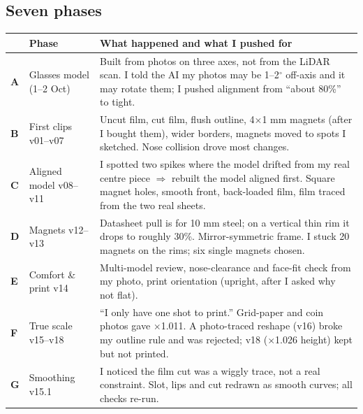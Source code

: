 \documentclass[10pt,a4paper,oneside]{article}
\begin{document}
\subsection{Seven phases}
\begin{center}
\end{center}
\small
\begin{tabularx}{\linewidth}{@{}>{\sffamily\bfseries\color{teal}}l>{\raggedright\arraybackslash}p{3.4cm}X@{}}
\toprule
 & \sffamily\bfseries Phase & \sffamily\bfseries What happened and what I pushed for \\ \midrule
A & Glasses model (1--2 Oct) & Built from photos on three axes, not from the LiDAR scan. I told the AI my photos may be 1--2$^\circ$ off-axis and it may rotate them; I pushed alignment from ``about 80\%'' to tight. \\
B & First clips v01--v07 & Uncut film, cut film, flush outline, 4$\times$1 mm magnets (after I bought them), wider borders, magnets moved to spots I sketched. Nose collision drove most changes. \\
C & Aligned model v08--v11 & I spotted two spikes where the model drifted from my real centre piece $\Rightarrow$ rebuilt the model aligned first. Square magnet holes, smooth front, back-loaded film, film traced from the two real sheets. \\
D & Magnets v12--v13 & Datasheet pull is for 10 mm steel; on a vertical thin rim it drops to roughly 30\%. Mirror-symmetric frame. I stuck 20 magnets on the rims; six single magnets chosen. \\
E & Comfort \& print v14 & Multi-model review, nose-clearance and face-fit check from my photo, print orientation (upright, after I asked why not flat). \\
F & True scale v15--v18 & ``I only have one shot to print.'' Grid-paper and coin photos gave $\times$1.011. A photo-traced reshape (v16) broke my outline rule and was rejected; v18 ($\times$1.026 height) kept but not printed. \\
G & Smoothing v15.1 & I noticed the film cut was a wiggly trace, not a real constraint. Slot, lips and cut redrawn as smooth curves; all checks re-run. \\ \bottomrule
\end{tabularx}
\normalsize
\end{document}

